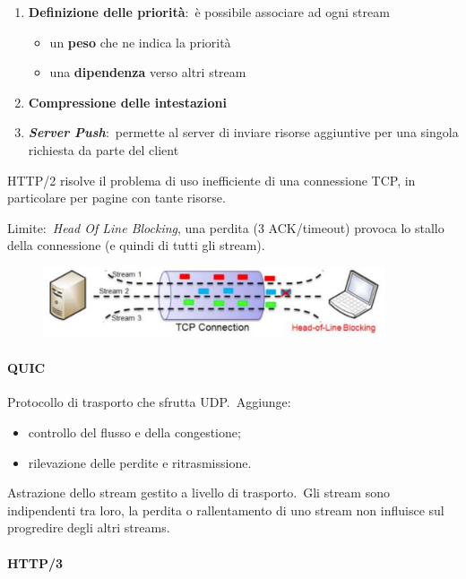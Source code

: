 \begin{enumerate}
\begin{itemize}
          \end{itemize}
    \item \textbf{Definizione delle priorità}:\ è possibile associare ad ogni stream
          \begin{itemize}
              \item un \textbf{peso} che ne indica la priorità
              \item una \textbf{dipendenza} verso altri stream
          \end{itemize}
    \item \textbf{Compressione delle intestazioni}
    \item \textbf{\emph{Server Push}}:\ permette al server di inviare risorse aggiuntive per una singola richiesta da parte del client
\end{enumerate}
HTTP/2 risolve il problema di uso inefficiente di una connessione TCP, in particolare per pagine con tante risorse.

Limite:\ \emph{Head Of Line Blocking}, una perdita (3 ACK/timeout) provoca lo stallo della connessione (e quindi di tutti gli stream).

\begin{figure}[H]
    \centering
    \includegraphics[width = 0.9\textwidth]{immagini/Head_of_line.jpg}
\end{figure}

\paragraph{QUIC}

Protocollo di trasporto che sfrutta UDP.\
Aggiunge:
\begin{itemize}
    \item controllo del flusso e della congestione;
    \item rilevazione delle perdite e ritrasmissione.
\end{itemize}
Astrazione dello stream gestito a livello di trasporto.\
Gli stream sono indipendenti tra loro, la perdita o rallentamento di uno stream non influisce sul progredire degli altri streams.

\paragraph{HTTP/3}

